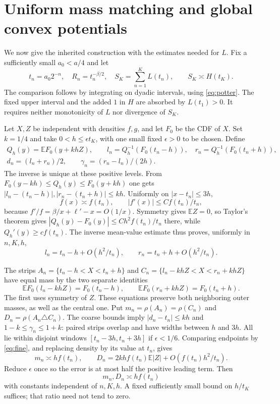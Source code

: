 \documentclass[11pt]{article}
\theoremstyle{remark}\newtheorem{remark}[theorem]{Remark}
\newcommand{\E}{\mathbb E}
\begin{document}
\section{Uniform mass matching and global convex potentials}
We now give the inherited construction with the estimates needed for $L$. Fix a sufficiently small $a_0<a/4$ and let
\begin{equation}\label{eq:dyadic}
 t_n=a_0 2^{-n},\quad R_n=t_n^{-\beta/2},\quad
 S_K=\sum_{n=1}^K L(t_n),\qquad
 S_K\asymp H(t_K).
\end{equation}
The comparison follows by integrating on dyadic intervals, using \eqref{eq:potter}. The fixed upper interval and the added $1$ in $H$ are absorbed by $L(t_1)>0$. It requires neither monotonicity of $L$ nor divergence of $S_K$.

Let $X,Z$ be independent with densities $f,g$, and let $F_0$ be the CDF of $X$. Set $k=1/4$ and take $0<h\le\epsilon t_K$, with one small fixed $\epsilon>0$ to be chosen. Define
\begin{gather}
 Q_h(y)=\E F_0(y+khZ),\qquad
 l_n=Q_h^{-1}(F_0(t_n-h)),\quad
 r_n=Q_h^{-1}(F_0(t_n+h)),\label{eq:match}\\
 d_n=(l_n+r_n)/2,\qquad \gamma_n=(r_n-l_n)/(2h).
\end{gather}
The inverse is unique at these positive levels. From
$F_0(y-kh)\le Q_h(y)\le F_0(y+kh)$ one gets
$|l_n-(t_n-h)|,|r_n-(t_n+h)|\le kh$.
Uniformly on $|x-t_n|\le3h$,
\[
 f(x)\asymp f(t_n),\qquad |f'(x)|\le C f(t_n)/t_n,
\]
because $f'/f=\beta/x+\ell'-x=O(1/x)$. Symmetry gives $\E Z=0$, so Taylor's theorem gives
$|Q_h(y)-F_0(y)|\le Ch^2f(t_n)/t_n$ there, while $Q_h'(y)\ge cf(t_n)$. The inverse mean-value estimate thus proves, uniformly in $n,K,h$,
\begin{equation}\label{eq:fine}
 l_n=t_n-h+O(h^2/t_n),\qquad r_n=t_n+h+O(h^2/t_n).
\end{equation}

The strips
$A_n=\{t_n-h<X<t_n+h\}$ and
$C_n=\{l_n-khZ<X<r_n+khZ\}$ have equal mass by the two separate identities
\begin{equation}\label{eq:cumulative}
 \E F_0(l_n-khZ)=F_0(t_n-h),\qquad
 \E F_0(r_n+khZ)=F_0(t_n+h).
\end{equation}
The first uses symmetry of $Z$. These equations preserve both neighboring outer masses, as well as the central one. Put $m_n=\rho(A_n)=\rho(C_n)$ and $D_n=\rho(A_n\triangle C_n)$. The coarse bounds imply $|d_n-t_n|\le kh$ and $1-k\le\gamma_n\le1+k$: paired strips overlap and have widths between $h$ and $3h$. All lie within disjoint windows $[t_n-3h,t_n+3h]$ if $\epsilon<1/6$. Comparing endpoints by \eqref{eq:fine}, and replacing density by its value at $t_n$, gives
\[
 m_n\asymp hf(t_n),\qquad
 D_n=2khf(t_n)\E|Z|+O(f(t_n)h^2/t_n).
\]
Reduce $\epsilon$ once so the error is at most half the positive leading term. Then
\begin{equation}\label{eq:local}
 m_n,D_n\asymp hf(t_n)
\end{equation}
with constants independent of $n,K,h$. A fixed sufficiently small bound on $h/t_K$ suffices; that ratio need not tend to zero.
\end{document}
